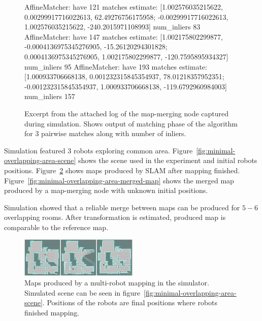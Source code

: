 \begin{figure}
    \centering
	\begin{code}
AffineMatcher: have 121 matches
estimate:
[1.002576035215622, 0.00299917716022613, 62.49276756175958;
 -0.00299917716022613, 1.002576035215622, -240.2015971108993]
num_inliers 83
AffineMatcher: have 147 matches
estimate:
[1.002175802299877, -0.0004136975345276905, -15.26120294301828;
 0.0004136975345276905, 1.002175802299877, -120.7595895934327]
num_inliers 95
AffineMatcher: have 193 matches
estimate:
[1.000933706668138, 0.001232315845354937, 78.01218357952351;
 -0.001232315845354937, 1.000933706668138, -119.6792960984003]
num_inliers 157
	\end{code}
    \caption[Excerpt from the attached log of the map-merging node.]{Excerpt from the attached log of the map-merging node captured during simulation. Shows output of matching phase of the algorithm for $3$ pairwise matches along with number of inliers.}
    \label{fig:minimal-overlapping-area-log}
\end{figure}


Simulation featured $3$ robots exploring common area. Figure~\ref{fig:minimal-overlapping-area-scene} shows the scene used in the experiment and initial robots positions. Figure~\ref{fig:minimal-overlapping-area-final-maps} shows maps produced by \gls{SLAM} after mapping finished. Figure~\ref{fig:minimal-overlapping-area-merged-map} shows the merged map produced by a map-merging node with unknown initial positions.

Simulation showed that a reliable merge between maps can be produced for $5-6$ overlapping rooms. After transformation is estimated, produced map is comparable to the reference map.

\begin{figure}
    \centering
    \includegraphics[width=2.22in]{../img/minimal-overlapping-area-final-maps.png}
    \caption[Maps produced by a multi-robot mapping in the simulator.]{Maps produced by a multi-robot mapping in the simulator. Simulated scene can be seen in figure~\ref{fig:minimal-overlapping-area-scene}. Positions of the robots are final positions where robots finished mapping.}
    \label{fig:minimal-overlapping-area-final-maps}
\end{figure}

